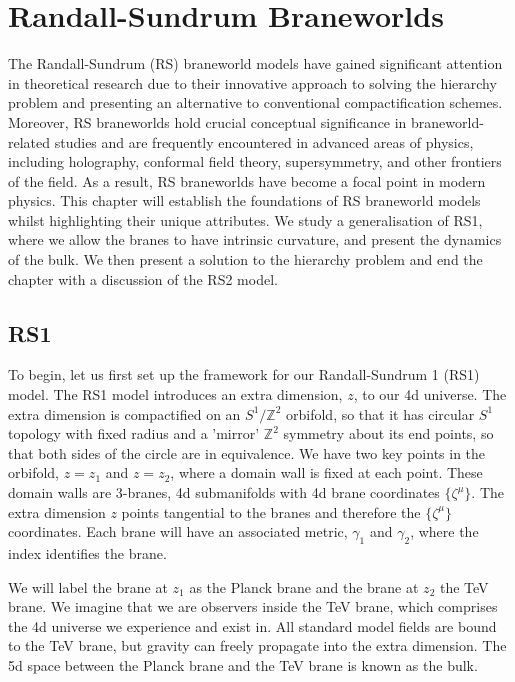 \documentclass[11pt]{report}
\numberwithin{equation}{chapter}
\begin{document}
\chapter{Randall-Sundrum Braneworlds}
The Randall-Sundrum (RS) braneworld models have gained significant attention in theoretical research due to their innovative approach to solving the hierarchy problem and presenting an alternative to conventional compactification schemes. Moreover, RS braneworlds hold crucial conceptual significance in braneworld-related studies and are frequently encountered in advanced areas of physics, including holography, conformal field theory, supersymmetry, and other frontiers of the field. As a result, RS braneworlds have become a focal point in modern physics. This chapter will establish the foundations of RS braneworld models whilst highlighting their unique attributes. We study a generalisation of RS1, where we allow the branes to have intrinsic curvature, and present the dynamics of the bulk. We then present a solution to the hierarchy problem and end the chapter with a discussion of the RS2 model. 
\section{RS1}
To begin, let us first set up the framework for our Randall-Sundrum 1 (RS1) model. The RS1 model introduces an extra dimension, $z$, to our 4d universe. The extra dimension is compactified on an $S^1/\mathbb{Z}^2$ orbifold, so that it has circular $S^1$ topology with fixed radius and a 'mirror' $\mathbb{Z}^2$ symmetry about its end points, so that both sides of the circle are in equivalence. We have two key points in the orbifold, $z=z_1$ and $z=z_2$, where a domain wall is fixed at each point. These domain walls are 3-branes, 4d submanifolds with 4d brane coordinates $ {\{ \zeta^\mu\}} $. The extra dimension $z$ points tangential to the branes and therefore the  ${\{ \zeta^\mu\}}$ coordinates. Each brane will have an associated metric, $\gamma_1$ and $\gamma_2$, where the index identifies the brane.

We will label the brane at $z_1$ as the Planck brane and the brane at $z_2$ the TeV brane. We imagine that we are observers inside the TeV brane, which comprises the 4d universe we experience and exist in. All standard model fields are bound to the TeV brane, but gravity can freely propagate into the extra dimension. The 5d space between the Planck brane and the TeV brane is known as the bulk.
\end{document}
